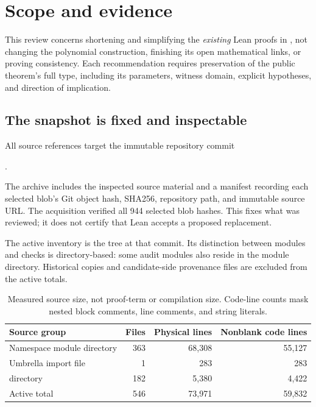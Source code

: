 \majorbreak
\section{Scope and evidence}
\label{sec:scope}

This review concerns shortening and simplifying the \emph{existing} Lean proofs in
, not changing the polynomial
construction, finishing its open mathematical links, or proving consistency.
Each recommendation requires preservation of the public theorem's full type, including its
parameters, witness domain, explicit hypotheses, and direction of implication.

\subsection{The snapshot is fixed and inspectable}

All source references target the immutable repository commit
\begin{center}
\small{}.
\end{center}
The archive includes the inspected source material and a manifest recording each
selected blob's Git object hash, SHA256, repository path, and immutable source
URL. The acquisition verified all 944 selected blob hashes.
This fixes what was reviewed; it does not certify that Lean accepts a proposed
replacement.

The active inventory is the  tree at that commit. Its distinction
between modules and checks is directory-based: some audit modules also reside
in the module directory. Historical  copies and
candidate-side provenance files are excluded from the active totals.

\begin{table}[h]
\centering
\small
\begin{tabularx}{\linewidth}{@{}Yrrr@{}}
\toprule
Source group & Files & Physical lines & Nonblank code lines\\
\midrule
Namespace module directory & 363 & 68,308 & 55,127\\
Umbrella import file & 1 & 283 & 283\\
 directory & 182 & 5,380 & 4,422\\
\midrule
Active total & 546 & 73,971 & 59,832\\
\bottomrule
\end{tabularx}
\caption{Measured source size, not proof-term or compilation size. Code-line
counts mask nested block comments, line comments, and string literals.}
\end{table}

